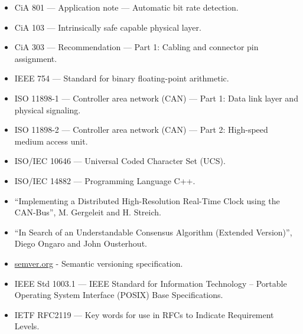 \begin{itemize}
    \item CiA 801 --- Application note --- Automatic bit rate detection.
    \item CiA 103 --- Intrinsically safe capable physical layer.
    \item CiA 303 --- Recommendation --- Part 1: Cabling and connector pin assignment.
    \item IEEE 754 --- Standard for binary floating-point arithmetic.
    \item ISO 11898-1 --- Controller area network (CAN) --- Part 1: Data link layer and physical signaling.
    \item ISO 11898-2 --- Controller area network (CAN) --- Part 2: High-speed medium access unit.
    \item ISO/IEC 10646 --- Universal Coded Character Set (UCS).
    \item ISO/IEC 14882 --- Programming Language C++.
    \item ``Implementing a Distributed High-Resolution Real-Time Clock using the CAN-Bus'', M. Gergeleit and H. Streich.
    \item ``In Search of an Understandable Consensus Algorithm (Extended Version)'', Diego Ongaro and John Ousterhout.
    \item \href{http://semver.org}{semver.org} - Semantic versioning specification.
    \item IEEE Std 1003.1 --- IEEE Standard for Information Technology --
    Portable Operating System Interface (POSIX) Base Specifications.
    \item IETF RFC2119 --- Key words for use in RFCs to Indicate Requirement Levels.
\end{itemize}
